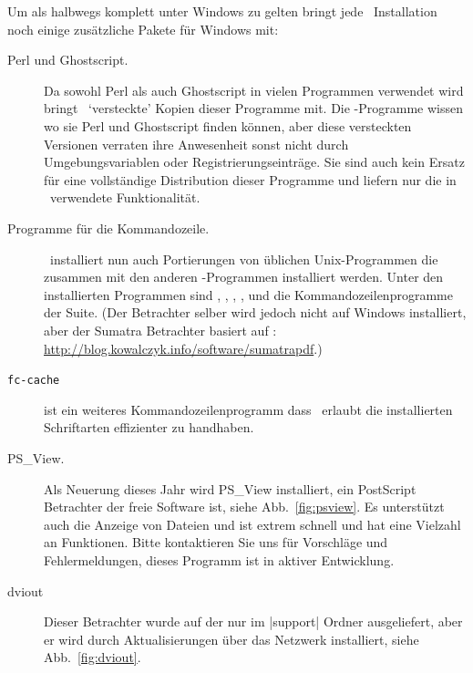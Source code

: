 Um als halbwegs komplett unter Windows zu gelten bringt jede \tl\ Installation
noch einige zusätzliche Pakete für Windows mit:
\begin{description}
\item[Perl und Ghostscript.] Da sowohl Perl als auch Ghostscript in vielen
  Programmen verwendet wird bringt \tl\ `versteckte' Kopien dieser
  Programme mit. Die \tl-Programme wissen wo sie Perl und Ghostscript
  finden können, aber diese versteckten Versionen verraten ihre Anwesenheit
  sonst nicht durch Umgebungsvariablen oder Registrierungseinträge.
  Sie sind auch kein Ersatz für eine vollständige Distribution dieser
  Programme und liefern nur die in \tl\ verwendete Funktionalität.
\item[Programme für die Kommandozeile.] 
  \tl\ installiert nun auch Portierungen von üblichen Unix-Programmen
  die zusammen mit den anderen \tl-Programmen installiert werden. Unter
  den installierten Programmen sind , ,
  , ,  und die Kommandozeilenprogramme
  der  Suite. (Der  Betrachter selber wird jedoch
  nicht auf Windows installiert, aber der Sumatra  Betrachter
  basiert auf :
  \url{http://blog.kowalczyk.info/software/sumatrapdf}.)
\item[\texttt{fc-cache}] ist ein weiteres Kommandozeilenprogramm
  dass \XeTeX\ erlaubt die installierten Schriftarten effizienter
  zu handhaben.
\item[PS\_View.] Als Neuerung dieses Jahr wird PS\_View installiert,
  ein PostScript Betrachter der freie Software ist, siehe 
  Abb.~\ref{fig:psview}. Es unterstützt auch die Anzeige von 
  Dateien und ist extrem schnell und hat eine Vielzahl an Funktionen.
  Bitte kontaktieren Sie uns für Vorschläge und Fehlermeldungen, dieses
  Programm ist in aktiver Entwicklung.
\item[dviout] Dieser  Betrachter wurde auf der  nur
  im |support| Ordner ausgeliefert, aber er wird durch Aktualisierungen
  über das Netzwerk installiert, siehe Abb.~\ref{fig:dviout}.
\end{description}

